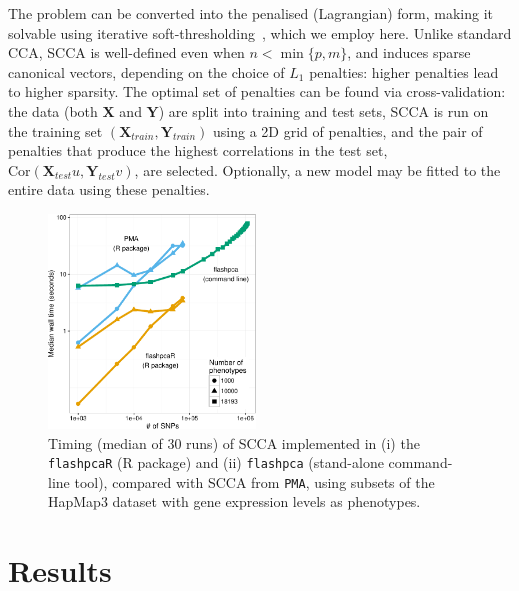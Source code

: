\documentclass{bioinfo}
\begin{document}
\begin{methods}
The problem can be converted into the penalised (Lagrangian) form, making it
solvable using iterative soft-thresholding~\citep{Parkhomenko2009}, which we
employ here.  Unlike standard CCA, SCCA is well-defined even when $n{<}\min
\{p, m\}$, and induces sparse canonical vectors, depending on the choice of
$L_1$ penalties: higher penalties lead to higher sparsity. The optimal set
of penalties can be found via cross-validation: the data (both $\mathbf{X}$
and $\mathbf{Y}$) are split into training and test sets, SCCA is run on the
training set $(\mathbf{X}_{train}, \mathbf{Y}_{train})$ using a 2D grid of
penalties, and the pair of penalties that produce the highest correlations
in the test set, $\mbox{Cor}(\mathbf{X}_{test} u, \mathbf{Y}_{test} v)$,
are selected.  Optionally, a new model may be fitted to the entire data using
these penalties. 

\enlargethispage{6pt}

\end{methods}

\begin{figure}[!tpb]
\centerline{\includegraphics[width=0.49\textwidth]{scca_timing-crop.pdf}}
\caption{
Timing (median of 30 runs) of SCCA implemented in (i) the \texttt{flashpcaR}
(\textsf{R} package) and (ii) \texttt{flashpca} (stand-alone command-line tool),
compared with SCCA from \texttt{PMA}, using subsets of the HapMap3 dataset with gene
expression levels as phenotypes.
}
\label{fig:01}
\end{figure}

\section{Results}
\end{document}
